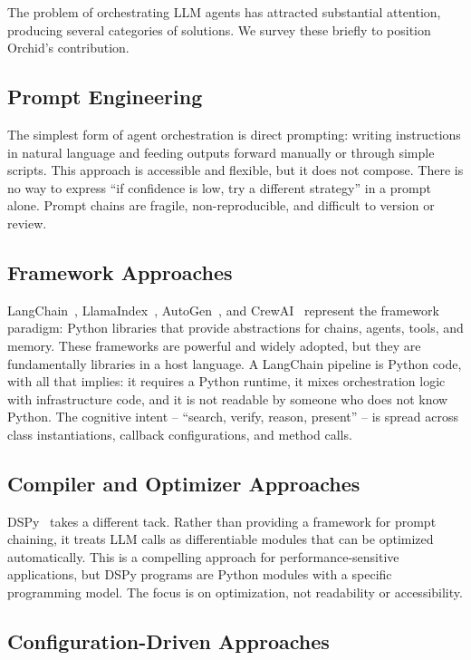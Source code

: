 \documentclass[11pt,a4paper]{article}
\begin{document}
The problem of orchestrating LLM agents has attracted substantial attention, producing several categories of solutions. We survey these briefly to position Orchid's contribution.

\subsection{Prompt Engineering}

The simplest form of agent orchestration is direct prompting: writing instructions in natural language and feeding outputs forward manually or through simple scripts. This approach is accessible and flexible, but it does not compose. There is no way to express ``if confidence is low, try a different strategy'' in a prompt alone. Prompt chains are fragile, non-reproducible, and difficult to version or review.

\subsection{Framework Approaches}

LangChain~\citep{langchain}, LlamaIndex~\citep{llamaindex}, AutoGen~\citep{autogen}, and CrewAI~\citep{crewai} represent the framework paradigm: Python libraries that provide abstractions for chains, agents, tools, and memory. These frameworks are powerful and widely adopted, but they are fundamentally libraries in a host language. A LangChain pipeline is Python code, with all that implies: it requires a Python runtime, it mixes orchestration logic with infrastructure code, and it is not readable by someone who does not know Python. The cognitive intent -- ``search, verify, reason, present'' -- is spread across class instantiations, callback configurations, and method calls.

\subsection{Compiler and Optimizer Approaches}

DSPy~\citep{dspy} takes a different tack. Rather than providing a framework for prompt chaining, it treats LLM calls as differentiable modules that can be optimized automatically. This is a compelling approach for performance-sensitive applications, but DSPy programs are Python modules with a specific programming model. The focus is on optimization, not readability or accessibility.

\subsection{Configuration-Driven Approaches}
\end{document}
